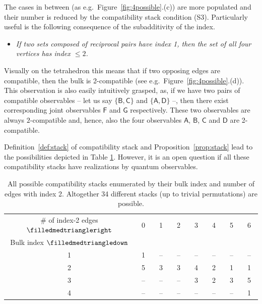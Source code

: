 \documentclass[12pt]{amsart}
\theoremstyle{definition}
\newcommand{\A}{\mathsf{A}}%
\newcommand{\B}{\mathsf{B}}%
\newcommand{\C}{\mathsf{C}}%
\newcommand{\D}{\mathsf{D}}%
\newcommand{\F}{\mathsf{F}}%
\newcommand{\G}{\mathsf{G}}%
\begin{document}
The cases in between (as e.g.~Figure~\ref{fig:4possible}.(c)) are more populated and their number is reduced by the compatibility stack condition (S3). 
Particularly useful is the following consequence of the subadditivity of the index.
\begin{itemize}[leftmargin=*,labelsep=4mm]
\item \emph{If two sets composed of  reciprocal pairs have index 1, then the set of all four vertices has index $\leq 2$.}
\end{itemize}
Visually on the tetrahedron this means that if two opposing edges are compatible, then the bulk is 2-compatible (see e.g.~Figure~\ref{fig:4possible}.(d)). This observation is also easily intuitively grasped, as, if we have two pairs of compatible observables -- let us say $\{\B,\C\}$ and $\{\A,\D\}$ --, then there exist corresponding joint observables $\F$ and $\G$ respectively. These two observables are always $2$-compatible and, hence, also the four observables $\A$, $\B$, $\C$ and $\D$ are 2-compatible.

Definition~\ref{def:stack} of compatibility stack and Proposition~\ref{prop:stack} lead to the possibilities depicted in Table \ref{tab:4obs}. 
However, it is an open question if all these compatibility stacks have realizations by quantum observables.

\begin{table}
\begin{center}
\begin{tabular}{|c|ccccccc|}
\hline
\# of index-2 edges $\filledmedtriangleright$ & \ 0\ & \ 1\ & \ 2\ & \ 3\ & \ 4\ & \ 5\ & \ 6\ \\
Bulk index $\filledmedtriangledown$ & & & & & & & \\
\hline
1 & 1 & -- & -- & -- & -- & -- & --\\
2 & 5 & 3 & 3 & 4 & 2 & 1 & 1\\
3 & -- & -- & -- & 3 & 2 & 3 & 5\\
4 & -- & -- & -- & -- & -- & -- & 1\\
\hline
\end{tabular}
\end{center}

\medskip

\caption{All possible compatibility stacks enumerated by their bulk index and number of edges with index 2.  Altogether 34 different stacks (up to trivial permutations) are possible.}
\label{tab:4obs}
\end{table}
\end{document}
